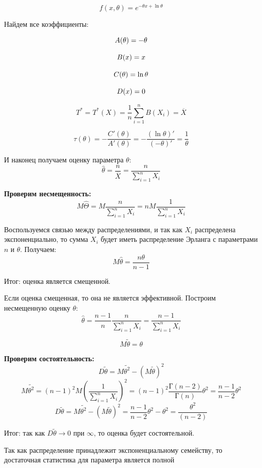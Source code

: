 \documentclass[a4paper,12pt, oneside]{book}
\begin{document}
$$
f(x, \theta) = e^{-\theta x + \ln\theta}
$$

Найдем все коэффициенты:

$$
A(\theta) = - \theta\\
$$

$$
B(x) = x\\
$$

$$
C(\theta) = \ln\theta\\
$$

$$
D(x) = 0\\
$$ 


$$
T^* = T^*(X) = \frac{1}{n} \sum\limits_{i = 1}^n B(X_i) = \overline{X}
$$

$$
\tau(\theta) = - \dfrac{C'(\theta)}{A'(\theta )}  = -\dfrac{(\ln\theta)'}{(-\theta)'} = \dfrac{1}{\theta}
$$

И наконец получаем оценку параметра $ \theta $:\\
$$
\hat{\theta} = \dfrac{n}{\overline{X}} = \dfrac{n}{\sum\limits_{i = 1}^n X_i}
$$

\textbf{Проверим несмещенность:}
$$
M\hat{\Theta} = M \dfrac{n}{\sum_{i= 1}^{n} X_i} = n M \dfrac{1}{\sum_{i = 1}^{n} X_i}
$$

Воспользуемся связью между распределениями, и так как $ X_i $ распределена экспоненциально, то сумма $ X_i $ будет иметь распределение Эрланга с параметрами $ n  $ и $ \theta $. Получаем:
$$
M\hat{\theta} = \dfrac{n \theta}{n - 1}
$$

Итог: оценка является смещенной.

Если оценка смещенная, то она не является эффективной. Построим несмещенную оценку $ \theta $:
$$
\hat{\theta} = \dfrac{n - 1}{n} \dfrac{n}{\sum_{i = 1}^{n} X_i} = \dfrac{n-1}{\sum_{i = 1}^{n} X_i}
$$

$$
M\tilde{\theta} = \theta 
$$

\textbf{Проверим состоятельность:}
$$
D \tilde{\theta} = M\tilde{\theta ^2}  - (M \tilde{\theta})^2 
$$
$$
M\tilde{\theta ^2} =  (n - 1)^2 M(\dfrac{1}{\sum_{i = 1}^{n}X_i})^2 = (n-1)^2 \dfrac{Г(n - 2)}{Г(n)} \theta^2 = \dfrac{n - 1}{n -2 }\theta^2
$$
$$
D \tilde{\theta} = M\tilde{\theta ^2}  - (M \tilde{\theta})^2  = \dfrac{n - 1}{n -2}\theta^2 - \theta^2 = \dfrac{\theta^2}{(n - 2)}
$$

Итог: так как $ D\tilde{\theta} \rightarrow 0 \text{ при }  \infty$, то оценка будет состоятельной.

Так как распределение принадлежит экспоненциальному семейству, то достаточная статистика для параметра является полной\\
\end{document}
